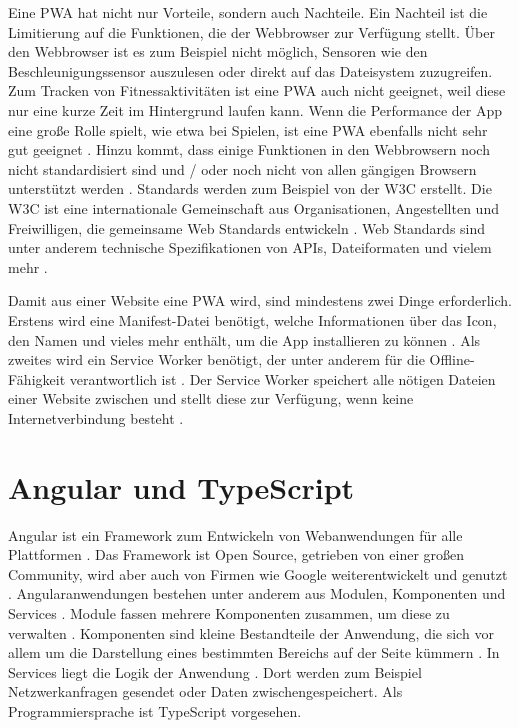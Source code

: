 Eine \ac{PWA} hat nicht nur Vorteile, sondern auch Nachteile. Ein Nachteil ist die Limitierung auf die Funktionen, die der Webbrowser zur Verfügung stellt. Über den Webbrowser ist es zum Beispiel nicht möglich, Sensoren wie den Beschleunigungssensor auszulesen oder direkt auf das Dateisystem zuzugreifen. Zum Tracken von Fitnessaktivitäten ist eine \ac{PWA} auch nicht geeignet, weil diese nur eine kurze Zeit im Hintergrund laufen kann. Wenn die Performance der App eine große Rolle spielt, wie etwa bei Spielen, ist eine \ac{PWA} ebenfalls nicht sehr gut geeignet \autocite{biorn2017}. Hinzu kommt, dass einige Funktionen in den Webbrowsern noch nicht standardisiert sind und / oder noch nicht von allen gängigen Browsern unterstützt werden \autocite{majchrzak2018} \autocite{biorn2017}. Standards werden zum Beispiel von der \ac{W3C} erstellt. Die \ac{W3C} ist eine internationale Gemeinschaft aus Organisationen, Angestellten und Freiwilligen, die gemeinsame Web Standards entwickeln \autocite{w3}. Web Standards sind unter anderem technische Spezifikationen von \acp{API}, Dateiformaten und vielem mehr \autocite{w3-standards}.

Damit aus einer Website eine \ac{PWA} wird, sind mindestens zwei Dinge erforderlich. Erstens wird eine Manifest-Datei benötigt, welche Informationen über das Icon, den Namen und vieles mehr enthält, um die App installieren zu können \autocite{Hajian2019} \autocite{Rojas2020}. Als zweites wird ein Service Worker benötigt, der unter anderem für die Offline-Fähigkeit verantwortlich ist \autocite{Rojas2020}. Der Service Worker speichert alle nötigen Dateien einer Website zwischen und stellt diese zur Verfügung, wenn keine Internetverbindung besteht \autocite{Rojas2020}.

\section{Angular und TypeScript}
Angular ist ein Framework zum Entwickeln von Webanwendungen für alle Plattformen \autocite{angular-io}. Das Framework ist Open Source, getrieben von einer großen Community, wird aber auch von Firmen wie Google weiterentwickelt und genutzt \autocite{angular-io}. Angularanwendungen bestehen unter anderem aus Modulen, Komponenten und Services \autocite{angular-start}. Module fassen mehrere Komponenten zusammen, um diese zu verwalten \autocite{angular-start}. Komponenten sind kleine Bestandteile der Anwendung, die sich vor allem um die Darstellung eines bestimmten Bereichs auf der Seite kümmern \autocite{angular-start} \autocite{Kotaru2020}. In Services liegt die Logik der Anwendung \autocite{angular-start}. Dort werden zum Beispiel Netzwerkanfragen gesendet oder Daten zwischengespeichert. Als Programmiersprache ist TypeScript vorgesehen. 

